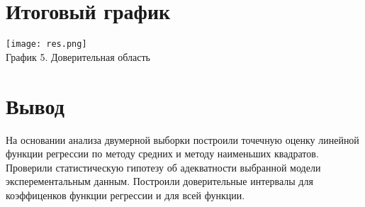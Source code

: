 \documentclass{article}
\begin{document}
\section*{Итоговый график}

\begin{center}
    \texttt{[image: res.png]}\\
    График 5. Доверительная область
\end{center}

\section*{Вывод}

На основании анализа двумерной выборки построили точечную оценку линейной функции регрессии по методу средних и методу наименьших квадратов.
Проверили статистическую гипотезу об адекватности выбранной модели эксперементальным данным.
Построили доверительные интервалы для коэффиценков функции регрессии и для всей функции.
\end{document}
